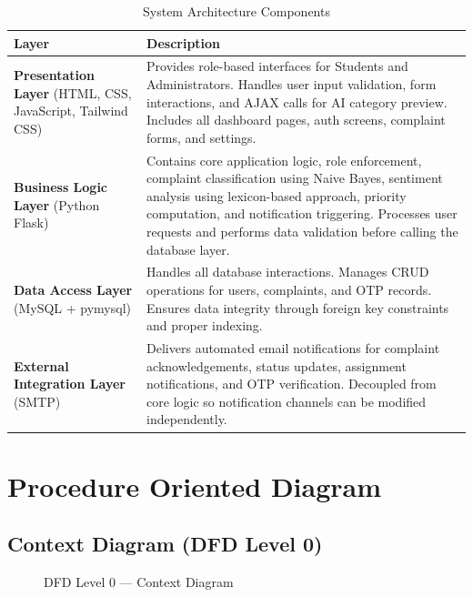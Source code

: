 \documentclass[12pt,a4paper]{report}
\begin{document}
\begin{table}[H]
\centering
\caption{System Architecture Components}
\begin{tabular}{p{3.5cm}p{11cm}}
\toprule
\textbf{Layer} & \textbf{Description} \\
\midrule
\textbf{Presentation Layer} (HTML, CSS, JavaScript, Tailwind CSS) & Provides role-based interfaces for Students and Administrators. Handles user input validation, form interactions, and AJAX calls for AI category preview. Includes all dashboard pages, auth screens, complaint forms, and settings. \\
\midrule
\textbf{Business Logic Layer} (Python Flask) & Contains core application logic, role enforcement, complaint classification using Naive Bayes, sentiment analysis using lexicon-based approach, priority computation, and notification triggering. Processes user requests and performs data validation before calling the database layer. \\
\midrule
\textbf{Data Access Layer} (MySQL + pymysql) & Handles all database interactions. Manages CRUD operations for users, complaints, and OTP records. Ensures data integrity through foreign key constraints and proper indexing. \\
\midrule
\textbf{External Integration Layer} (SMTP) & Delivers automated email notifications for complaint acknowledgements, status updates, assignment notifications, and OTP verification. Decoupled from core logic so notification channels can be modified independently. \\
\bottomrule
\end{tabular}
\end{table}

\section{Procedure Oriented Diagram}

\subsection{Context Diagram (DFD Level 0)}

\begin{figure}[H]
\centering
{}
\caption{DFD Level 0 — Context Diagram}
\end{figure}
\end{document}
